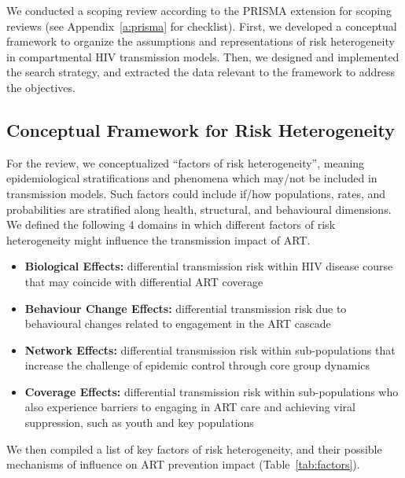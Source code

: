 We conducted a scoping review according to the PRISMA extension for scoping reviews
(see Appendix~\ref{a:prisma} for checklist).
First, we developed a conceptual framework to organize
the assumptions and representations of risk heterogeneity
in compartmental HIV transmission models.
Then, we designed and implemented the search strategy,
and extracted the data relevant to the framework
to address the objectives.
\subsection{Conceptual Framework for Risk Heterogeneity}
\label{ss:meth:framework}
For the review, we conceptualized ``factors of risk heterogeneity'', meaning
epidemiological stratifications and phenomena which may/not be included in transmission models.
Such factors could include if/how populations, rates, and probabilities
are stratified along health, structural, and behavioural dimensions.
We defined the following 4 domains in which
different factors of risk heterogeneity might influence the transmission impact of ART.
\begin{itemize}
  \item \textbf{Biological Effects:}
  differential transmission risk within HIV disease course
  that may coincide with differential ART coverage
  \cite{Pilcher2004}
  \item \textbf{Behaviour Change Effects:}
  differential transmission risk due to
  behavioural changes related to engagement in the ART cascade
  \cite{Ramachandran2016,Tiwari2020} %
  \item \textbf{Network Effects:}
  differential transmission risk within sub-populations
  that increase the challenge of epidemic control through core group dynamics
  \cite{Anderson1986,Boily1997,Watts2010,Dodd2010}
  \item \textbf{Coverage Effects:}
  differential transmission risk within sub-populations
  who also experience barriers to engaging in ART care and achieving viral suppression,
  such as youth and key populations
  \cite{Mountain2014,Lancaster2016,Hakim2018,Green2020}
\end{itemize}
We then compiled a list of key factors of risk heterogeneity,
and their possible mechanisms of influence on ART prevention impact (Table~\ref{tab:factors}).
